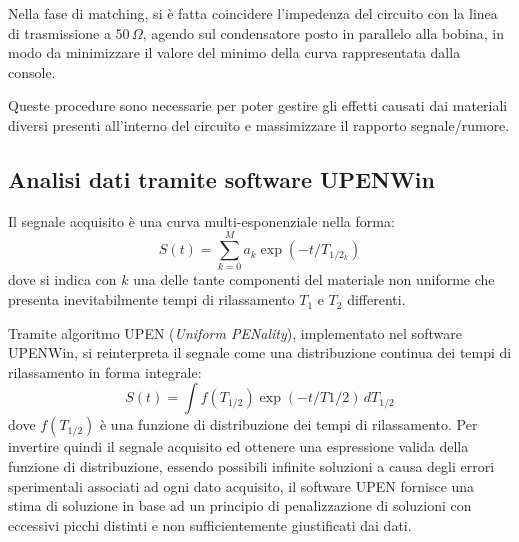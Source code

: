 Nella fase di matching, si è fatta coincidere l'impedenza del circuito con la linea di trasmissione a $50\si{\,}{\Omega}$, agendo sul condensatore posto in parallelo alla bobina, in modo da minimizzare il valore del minimo della curva rappresentata dalla console.

Queste procedure sono necessarie per poter gestire gli effetti causati dai materiali diversi presenti all'interno del circuito e massimizzare il rapporto segnale/rumore.

\subsection*{Analisi dati tramite software UPENWin}

Il segnale acquisito è una curva multi-esponenziale nella forma:
\begin{equation}
	S(t) = \sum_{k=0}^M a_k \exp(-t/T_{1/2_k})
\end{equation}
dove si indica con $k$ una delle tante componenti del materiale non uniforme che presenta inevitabilmente tempi di rilassamento $T_1$ e $T_2$ differenti.

Tramite algoritmo UPEN (\textit{Uniform PENality}), implementato nel software UPENWin, si reinterpreta il segnale come una distribuzione continua dei tempi di rilassamento in forma integrale:
\begin{equation}
	S(t) = \int f(T_{1/2}) \exp(-t/T{1/2}) \, dT_{1/2}
\end{equation}
dove $f(T_{1/2})$ è una funzione di distribuzione dei tempi di rilassamento. Per invertire quindi il segnale acquisito ed ottenere una espressione valida della funzione di distribuzione, essendo possibili infinite soluzioni a causa degli errori sperimentali associati ad ogni dato acquisito, il software UPEN fornisce una stima di soluzione in base ad un principio di penalizzazione di soluzioni con eccessivi picchi distinti e non sufficientemente giustificati dai dati.